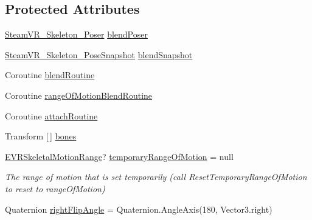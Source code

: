 \subsection*{Protected Attributes}
\begin{DoxyCompactItemize}
\item 
\mbox{\hyperlink{class_valve_1_1_v_r_1_1_steam_v_r___skeleton___poser}{Steam\+V\+R\+\_\+\+Skeleton\+\_\+\+Poser}} \mbox{\hyperlink{class_valve_1_1_v_r_1_1_steam_v_r___behaviour___skeleton_a2289bb64346b9d8dcb42eb73dbb1a303}{blend\+Poser}}
\item 
\mbox{\hyperlink{class_valve_1_1_v_r_1_1_steam_v_r___skeleton___pose_snapshot}{Steam\+V\+R\+\_\+\+Skeleton\+\_\+\+Pose\+Snapshot}} \mbox{\hyperlink{class_valve_1_1_v_r_1_1_steam_v_r___behaviour___skeleton_a685d92bdbde297f300236f2a191c71f1}{blend\+Snapshot}}
\item 
Coroutine \mbox{\hyperlink{class_valve_1_1_v_r_1_1_steam_v_r___behaviour___skeleton_a67588374bb27e8b158899c45af1d6dc8}{blend\+Routine}}
\item 
Coroutine \mbox{\hyperlink{class_valve_1_1_v_r_1_1_steam_v_r___behaviour___skeleton_a8efe59bda7084eb8f29d0876a9d14fa6}{range\+Of\+Motion\+Blend\+Routine}}
\item 
Coroutine \mbox{\hyperlink{class_valve_1_1_v_r_1_1_steam_v_r___behaviour___skeleton_a9a04b22affd00015ac920e5ad44051b2}{attach\+Routine}}
\item 
Transform \mbox{[}$\,$\mbox{]} \mbox{\hyperlink{class_valve_1_1_v_r_1_1_steam_v_r___behaviour___skeleton_a2d3777243063ea2b595d0f4791f3c7f3}{bones}}
\item 
\mbox{\hyperlink{namespace_valve_1_1_v_r_affc8d18345f8f5d36f1ae7b4ce534500}{E\+V\+R\+Skeletal\+Motion\+Range}}? \mbox{\hyperlink{class_valve_1_1_v_r_1_1_steam_v_r___behaviour___skeleton_a3a59fa3d40d8e23688ea2bcb9e9bbf62}{temporary\+Range\+Of\+Motion}} = null
\begin{DoxyCompactList}\small\item\em The range of motion that is set temporarily (call Reset\+Temporary\+Range\+Of\+Motion to reset to range\+Of\+Motion) \end{DoxyCompactList}\item 
Quaternion \mbox{\hyperlink{class_valve_1_1_v_r_1_1_steam_v_r___behaviour___skeleton_a74ba4ce284a64264550041902c0636e5}{right\+Flip\+Angle}} = Quaternion.\+Angle\+Axis(180, Vector3.\+right)
\end{DoxyCompactItemize}
